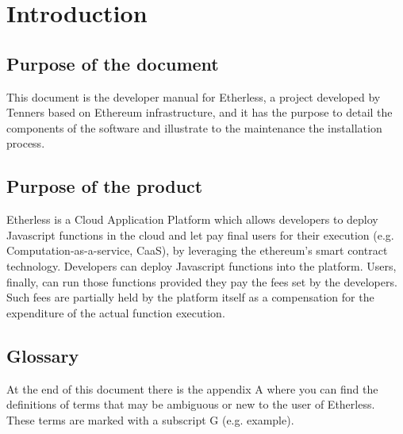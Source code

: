 \section{Introduction}

\subsection{Purpose of the document}
This document is the developer manual for Etherless, a project developed by Tenners based on Ethereum infrastructure, and it has the purpose to detail the components of the software and illustrate to the maintenance the installation process.

\subsection{Purpose of the product}
Etherless is a Cloud Application Platform which allows developers to deploy Javascript functions in the cloud and let pay final users for their execution (e.g. Computation-as-a-service, CaaS), by leveraging the ethereum's smart contract technology. Developers can deploy Javascript functions into the platform. Users, finally, can run those functions provided they pay the fees set by the developers. Such fees are partially held by the platform itself as a compensation for the expenditure of the actual function execution.

\subsection{Glossary}
At the end of this document there is the appendix A where you can find the definitions of terms that may be ambiguous or new to the user of Etherless. These terms are marked with a subscript G (e.g. example\glos).

%
